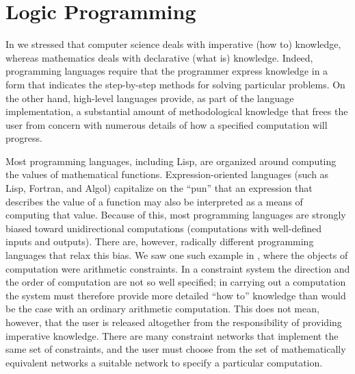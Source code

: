 \section{Logic Programming}
\label{Section 4.4}

In  we stressed that computer science deals with imperative (how to) knowledge, whereas mathematics deals with declarative (what is) knowledge.
Indeed, programming languages require that the programmer express knowledge in a form that indicates the step-by-step methods for solving particular problems.
On the other hand, high-level languages provide, as part of the language implementation, a substantial amount of methodological knowledge that frees the user from concern with numerous details of how a specified computation will progress.

Most programming languages, including Lisp, are organized around computing the values of mathematical functions.
Expression-oriented languages (such as Lisp, Fortran, and Algol) capitalize on the “pun” that an expression that describes the value of a function may also be interpreted as a means of computing that value.
Because of this, most programming languages are strongly biased toward unidirectional computations (computations with well-defined inputs and outputs).
There are, however, radically different programming languages that relax this bias.
We saw one such example in , where the objects of computation were arithmetic constraints.
In a constraint system the direction and the order of computation are not so well specified;
in carrying out a computation the system must therefore provide more detailed “how to” knowledge than would be the case with an ordinary arithmetic computation.
This does not mean, however, that the user is released altogether from the responsibility of providing imperative knowledge.
There are many constraint networks that implement the same set of constraints, and the user must choose from the set of mathematically equivalent networks a suitable network to specify a particular computation.

